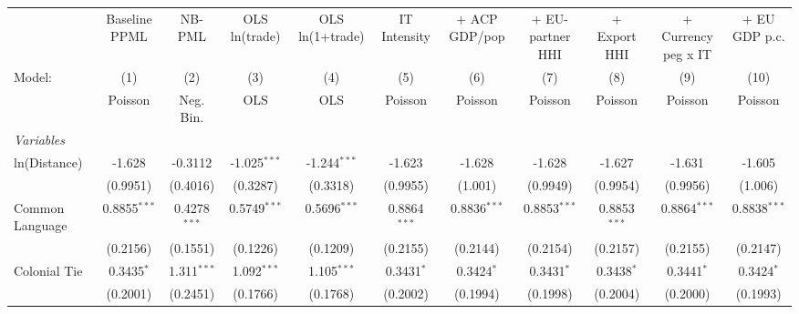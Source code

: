 
\begingroup
\centering
\begin{tabular}{lcccccccccc}
   \tabularnewline \midrule \midrule
                                                      & Baseline PPML  & NB-PML          & OLS ln(trade)  & OLS ln(1+trade) & IT Intensity   & + ACP GDP/pop  & + EU-partner HHI & + Export HHI   & + Currency peg x IT & + EU GDP p.c. \\   
   Model:                                             & (1)            & (2)             & (3)            & (4)             & (5)            & (6)            & (7)              & (8)            & (9)                 & (10)\\  
                                                      &  Poisson       & Neg. Bin.       & OLS            & OLS             & Poisson        & Poisson        & Poisson          & Poisson        & Poisson             & Poisson\\  
   \midrule
   \emph{Variables}\\
   ln(Distance)                                       & -1.628         & -0.3112         & -1.025$^{***}$ & -1.244$^{***}$  & -1.623         & -1.628         & -1.628           & -1.627         & -1.631              & -1.605\\   
                                                      & (0.9951)       & (0.4016)        & (0.3287)       & (0.3318)        & (0.9955)       & (1.001)        & (0.9949)         & (0.9954)       & (0.9956)            & (1.006)\\   
   Common Language                                    & 0.8855$^{***}$ & 0.4278$^{***}$  & 0.5749$^{***}$ & 0.5696$^{***}$  & 0.8864$^{***}$ & 0.8836$^{***}$ & 0.8853$^{***}$   & 0.8853$^{***}$ & 0.8864$^{***}$      & 0.8838$^{***}$\\   
                                                      & (0.2156)       & (0.1551)        & (0.1226)       & (0.1209)        & (0.2155)       & (0.2144)       & (0.2154)         & (0.2157)       & (0.2155)            & (0.2147)\\   
   Colonial Tie                                       & 0.3435$^{*}$   & 1.311$^{***}$   & 1.092$^{***}$  & 1.105$^{***}$   & 0.3431$^{*}$   & 0.3424$^{*}$   & 0.3431$^{*}$     & 0.3438$^{*}$   & 0.3441$^{*}$        & 0.3424$^{*}$\\   
                                                      & (0.2001)       & (0.2451)        & (0.1766)       & (0.1768)        & (0.2002)       & (0.1994)       & (0.1998)         & (0.2004)       & (0.2000)            & (0.1993)\\   

\end{tabular}
